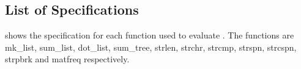\begin{appendices}
\chapter*{List of Specifications}
\label{app:specifications}
 shows the \SpecL{} specification for each function used to evaluate \toolName{}.
The functions are mk\_list, sum\_list, dot\_list, sum\_tree, strlen, strchr, strcmp, strspn,
strcspn, strpbrk and matfreq respectively.


\end{appendices}